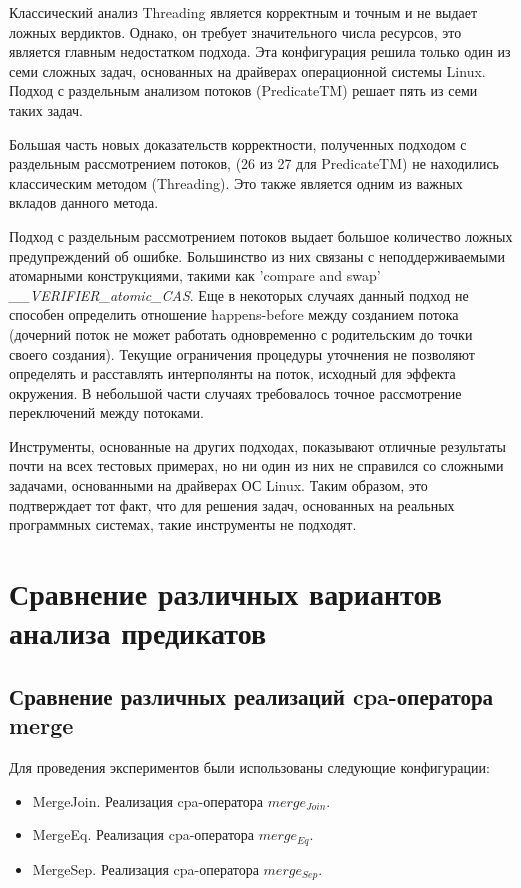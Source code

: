 Классический анализ Threading является корректным и точным и не выдает ложных вердиктов.
Однако, он требует значительного числа ресурсов, это является главным недостатком подхода.
Эта конфигурация решила только один из семи сложных задач, основанных на драйверах операционной системы Linux.
Подход с раздельным анализом потоков (PredicateTM) решает пять из семи таких задач. 

Большая часть новых доказательств корректности, полученных подходом с раздельным рассмотрением потоков, (26 из 27 для PredicateTM) не находились классическим методом (Threading). Это также является одним из важных вкладов данного метода.

Подход с раздельным рассмотрением потоков выдает большое количество ложных предупреждений об ошибке. 
Большинство из них связаны с неподдерживаемыми атомарными конструкциями, такими как 'compare and swap' {\em \_\_VERIFIER\_atomic\_CAS}.
Еще в некоторых случаях данный подход не способен определить отношение happens-before между созданием потока (дочерний поток не может работать одновременно с родительским до точки своего создания).
Текущие ограничения процедуры уточнения не позволяют определять и расставлять интерполянты на поток, исходный для эффекта окружения.
В небольшой части случаях требовалось точное рассмотрение переключений между потоками.

Инструменты, основанные на других подходах, показывают отличные результаты почти на всех тестовых примерах, но ни один из них не справился со сложными задачами, основанными на драйверах ОС Linux. 
Таким образом, это подтверждает тот факт, что для решения задач, основанных на реальных программных системах, такие инструменты не подходят. 

\section{Сравнение различных вариантов анализа предикатов}

\subsection{Сравнение различных реализаций cpa-оператора merge}

Для проведения экспериментов были использованы следующие конфигурации:

\begin{itemize}
\item MergeJoin. Реализация cpa-оператора $merge_{Join}$.
\item MergeEq. Реализация cpa-оператора $merge_{Eq}$.
\item MergeSep. Реализация cpa-оператора $merge_{Sep}$.
\end{itemize}

